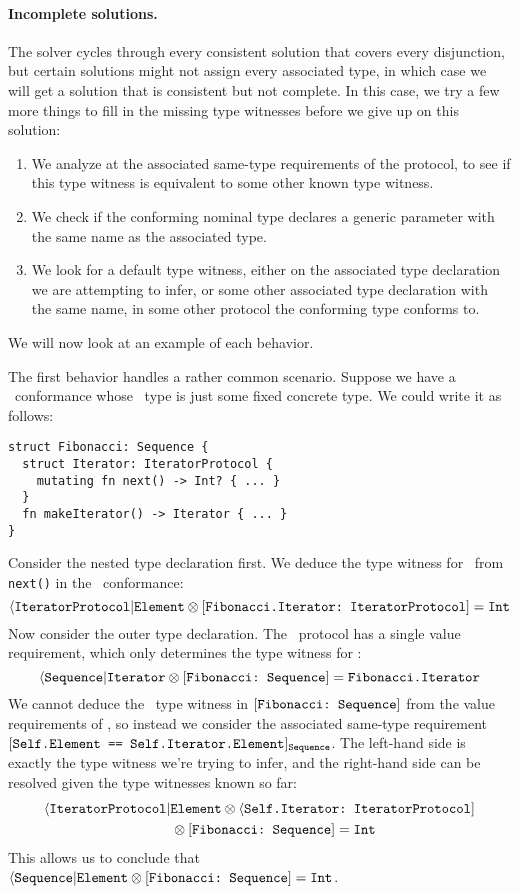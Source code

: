 \documentclass[../generics]{subfiles}
\begin{document}
\paragraph{Incomplete solutions.} The solver cycles through every consistent solution that covers every disjunction, but certain solutions might not assign every associated type, in which case we will get a solution that is consistent but not complete. In this case, we try a few more things to fill in the missing type witnesses before we give up on this solution:
\begin{enumerate}
\item We analyze at the associated same-type requirements of the protocol, to see if this type witness is equivalent to some other known type witness.
\item We check if the conforming nominal type declares a generic parameter with the same name as the associated type.
\item We look for a default type witness, either on the associated type declaration we are attempting to infer, or some other associated type declaration with the same name, in some other protocol the conforming type conforms to.
\end{enumerate}
We will now look at an example of each behavior.

\begin{example}
The first behavior handles a rather common scenario. Suppose we have a \tSequence\ conformance whose \nElement\ type is just some fixed concrete type. We could write it as follows:
\begin{Verbatim}
struct Fibonacci: Sequence {
  struct Iterator: IteratorProtocol {
    mutating fn next() -> Int? { ... }
  }
  fn makeIterator() -> Iterator { ... }
}
\end{Verbatim}
Consider the nested type declaration first. We deduce the type witness for \nElement\ from \texttt{next()} in the \tIterator\ conformance:
\[\langle\texttt{IteratorProtocol}|\texttt{Element}\otimes[\texttt{Fibonacci.Iterator:~IteratorProtocol}]=\texttt{Int}\]
Now consider the outer type declaration. The \tSequence\ protocol has a single value requirement, which only determines the type witness for \nIterator:
\[\langle\texttt{Sequence}|\texttt{Iterator}\otimes[\texttt{Fibonacci:~Sequence}]=\texttt{Fibonacci.Iterator}\]
We cannot deduce the \nElement\ type witness in $[\texttt{Fibonacci:~Sequence}]$ from the value requirements of \tSequence, so instead we consider the associated same-type requirement $[\texttt{Self.Element == Self.Iterator.Element}]_{\texttt{Sequence}}$. The left-hand side is exactly the type witness we're trying to infer, and the right-hand side can be resolved given the type witnesses known so far:
\begin{gather*}
\langle\texttt{IteratorProtocol}|\texttt{Element} \otimes \langle\texttt{Self.Iterator:~IteratorProtocol}] \\
\qquad {} \otimes [\texttt{Fibonacci:~Sequence}] = \texttt{Int}
\end{gather*}
This allows us to conclude that $\langle\texttt{Sequence}|\texttt{Element} \otimes[\texttt{Fibonacci:~Sequence}] = \texttt{Int}$.
\end{example}
\end{document}
